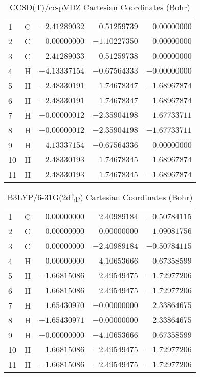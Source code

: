 \documentclass[10pt,oneside]{article}
\begin{document}
\begin{table}[h!]
\centering
\caption{CCSD(T)/cc-pVDZ Cartesian Coordinates (Bohr)}
\begin{tabular}{llrrr}
1  & C  & $-2.41289032$ & $ 0.51259739$ & $ 0.00000000$ \\
2  & C  & $ 0.00000000$ & $-1.10227350$ & $ 0.00000000$ \\
3  & C  & $ 2.41289033$ & $ 0.51259738$ & $ 0.00000000$ \\
4  & H  & $-4.13337154$ & $-0.67564333$ & $-0.00000000$ \\
5  & H  & $-2.48330191$ & $ 1.74678347$ & $-1.68967874$ \\
6  & H  & $-2.48330191$ & $ 1.74678347$ & $ 1.68967874$ \\
7  & H  & $-0.00000012$ & $-2.35904198$ & $ 1.67733711$ \\
8  & H  & $-0.00000012$ & $-2.35904198$ & $-1.67733711$ \\
9  & H  & $ 4.13337154$ & $-0.67564336$ & $ 0.00000000$ \\
10 & H  & $ 2.48330193$ & $ 1.74678345$ & $ 1.68967874$ \\
11 & H  & $ 2.48330193$ & $ 1.74678345$ & $-1.68967874$ \\
\end{tabular}
\end{table}

\begin{table}[h!]
\centering
\caption{B3LYP/6-31G(2df,p) Cartesian Coordinates (Bohr)}
\begin{tabular}{llrrr}
1  & C  & $ 0.00000000$ & $ 2.40989184$ & $-0.50784115$ \\
2  & C  & $ 0.00000000$ & $ 0.00000000$ & $ 1.09081756$ \\
3  & C  & $ 0.00000000$ & $-2.40989184$ & $-0.50784115$ \\
4  & H  & $ 0.00000000$ & $ 4.10653666$ & $ 0.67358599$ \\
5  & H  & $-1.66815086$ & $ 2.49549475$ & $-1.72977206$ \\
6  & H  & $ 1.66815086$ & $ 2.49549475$ & $-1.72977206$ \\
7  & H  & $ 1.65430970$ & $-0.00000000$ & $ 2.33864675$ \\
8  & H  & $-1.65430971$ & $-0.00000000$ & $ 2.33864675$ \\
9  & H  & $-0.00000000$ & $-4.10653666$ & $ 0.67358599$ \\
10 & H  & $ 1.66815086$ & $-2.49549475$ & $-1.72977206$ \\
11 & H  & $-1.66815086$ & $-2.49549475$ & $-1.72977206$ \\
\end{tabular}
\end{table}
\end{document}
